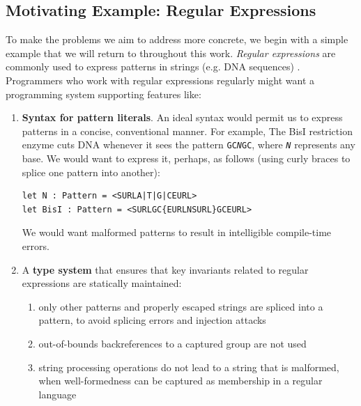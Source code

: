 \subsection{Motivating Example: Regular Expressions}\label{regex}
To make the problems we aim to address more concrete, we begin with a simple example that we will return to throughout this work. \emph{Regular expressions} are commonly used to express patterns in strings (e.g. DNA sequences) \cite{Thompson:1968:PTR:363347.363387}. Programmers who work with regular expressions regularly might want a programming system supporting features like:

\begin{enumerate}
\item \textbf{Syntax for pattern literals}. An ideal syntax would permit us to express patterns in a concise, conventional manner. For example, The BisI restriction enzyme cuts DNA whenever it sees the pattern \texttt{GC\textit{N}GC}, where \texttt{\textit{N}} represents any base. We would want to express it, perhaps, as follows (using curly braces to splice one pattern into another):
\begin{lstlisting}[numbers=none]
let N : Pattern = <SURLA|T|G|CEURL>
let BisI : Pattern = <SURLGC{EURLNSURL}GCEURL>\end{lstlisting}
We would want malformed patterns to result in intelligible {compile-time} errors.
\item A \textbf{type system} that ensures that key invariants related to regular expressions are statically maintained:
	\begin{enumerate}
	\item only other patterns and properly escaped strings are spliced into a pattern, to avoid splicing errors and injection attacks \cite{owasp2013, Bravenboer:2007:PIA:1289971.1289975}
	\item out-of-bounds backreferences to a captured group are not used \cite{spishak2012type}
	\item string processing operations do not lead to a string that is malformed, when well-formedness can be captured as membership in a regular language \cite{fulton-thesis,HosoyaVouillonPierce2000ICFP}
	\end{enumerate}

\end{enumerate}
